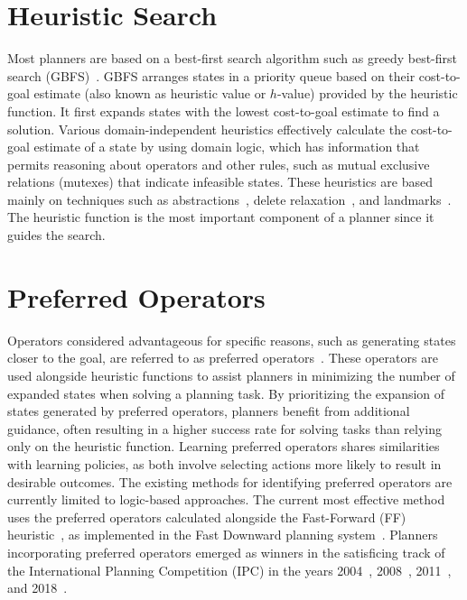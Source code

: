 \documentclass[ppgc,diss,english]{iiufrgs}
\begin{document}
\section{Heuristic Search}
\label{sec:intro-heuristic-search}
Most planners are based on a best-first search algorithm such as greedy best-first search (GBFS)~\cite{Doran.Michie/1966}. GBFS arranges states in a priority queue based on their cost-to-goal estimate (also known as heuristic value or $h$-value) provided by the heuristic function. It first expands states with the lowest cost-to-goal estimate to find a solution. Various domain-independent heuristics effectively calculate the cost-to-goal estimate of a state by using domain logic, which has information that permits reasoning about operators and other rules, such as mutual exclusive relations (mutexes) that indicate infeasible states. These heuristics are based mainly on techniques such as abstractions~\cite{Culberson.Schaeffer/1998}, delete relaxation~\cite{Hoffmann.Nebel/2001}, and landmarks~\cite{Hoffmann.etal/2004,Helmert.Domshlak/2009}. The heuristic function is the most important component of a planner since it guides the search.


\section{Preferred Operators}
\label{sec:intro-preferred-ops}
Operators considered advantageous for specific reasons, such as generating states closer to the goal, are referred to as preferred operators~\cite{Helmert/2006,Richter.Helmert/2009}. These operators are used alongside heuristic functions to assist planners in minimizing the number of expanded states when solving a planning task.
By prioritizing the expansion of states generated by preferred operators, planners benefit from additional guidance, often resulting in a higher success rate for solving tasks than relying only on the heuristic function. Learning preferred operators shares similarities with learning policies, as both involve selecting actions more likely to result in desirable outcomes. The existing methods for identifying preferred operators are currently limited to logic-based approaches. The current most effective method uses the preferred operators calculated alongside the Fast-Forward (FF) heuristic~\cite{Hoffmann.Nebel/2001}, as implemented in the Fast Downward planning system~\cite{Helmert/2006}. Planners incorporating preferred operators emerged as winners in the satisficing track of the International Planning Competition (IPC) in the years 2004~\cite{Helmert/2006}, 2008~\cite{Richter.lama.etal/2010}, 2011~\cite{Richter.lama.etal/2011}, and 2018~\cite{Seipp-fast.etal/2018}.
\end{document}
